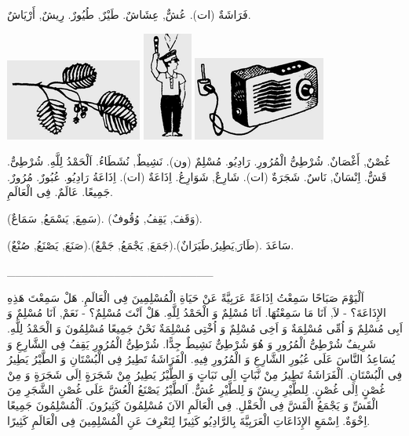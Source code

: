 \documentclass[a5paper]{article}
\begin{document}
فَرَاشَةٌ (ات). عُشٌّ, عِشَاشٌ. طَيْرٌ, طُيُورٌ. رِيشٌ, أَرْيَاشٌ. 

 \includegraphics[width=1.7602in,height=1.052in]{MuhammadBagauddinlatinized-img070.png}   \includegraphics[width=0.6354in,height=1.4063in]{MuhammadBagauddinlatinized-img071.png}   \includegraphics[width=1.7083in,height=1.0835in]{MuhammadBagauddinlatinized-img072.png} 

غُصْنٌ, أَغْصَانٌ. شُرْطِىُّ الْمُرُورِ. رَادِيُو. مُسْلِمٌ (ون). نَشِيطٌ, نُشَطَاءُ. اَلْحَمْدُ لِلَّهِ. شُرْطِىٌّ. قَشٌّ. اِنْسَانٌ, نَاسٌ. شَجَرَةٌ (ات). شَارِعٌ, شَوَارِعُ. اِذَاعَةٌ (ات). اِذَاعَةُ رَادِيُو. عُبُورٌ. مُرُورٌ. جَمِيعًا. عَالَمٌ. فِى الْعَالَمِ.

(سَمِعَ, يَسْمَعُ, سَمَاعٌ). (وَقَفَ, يَقِفُ, وُقُوفٌ).

(صَنَعَ, يَصْنَعُ, صُنْعٌ).(جَمَعَ, يَجْمَعُ, جَمْعٌ).(طَارَ,يَطِيرُ,طَيَرَانٌ). سَاعَدَ.

\_\_\_\_\_\_\_\_\_\_\_\_\_\_\_\_\_\_\_\_\_\_\_\_\_

اَلْيَوْمَ صَبَاحًا سَمِعْتُ اِذَاعَةً عَرَبِيَّةً عَنْ حَيَاةِ الْمُسْلِمِينَ فِى الْعَالَمِ. هَلْ سَمِعْتَ هَذِهِ الإِذَاعَةَ؟ - لاَ, اَنَا مَا سَمِعْتُهَا. اَنَا مُسْلِمٌ وَ الْحَمْدُ لِلَّهِ. هَلْ اَنْتَ مُسْلِمٌ؟ - نَعَمْ, اَنَا مُسْلِمٌ وَ اَبِى مُسْلِمٌ وَ اُمِّى مُسْلِمَةٌ وَ اَخِى مُسْلِمٌ وَ اُخْتِى مُسْلِمَةٌ نَحْنُ جَمِيعًا مُسْلِمُونَ وَ الْحَمْدُ لِلَّهِ. شَرِيفٌ شُرْطِىُّ الْمُرُورِ وَ هُوَ شُرْطِىٌّ نَشِيطٌ جِدًّا. شُرْطِىُّ الْمُرُورِ يَقِفُ فِى الشَّارِعِ وَ يُسَاعِدُ النَّاسَ عَلَى عُبُورِ الشَّارِعِ وَ الْمُرُورِ فِيهِ. الْفَرَاشَةُ تَطِيرُ فِى الْبُسْتَانِ وَ الطَّيْرُ يَطِيرُ فِى الْبُسْتَانِ. اَلْفَرَاشَةُ تَطِيرُ مِنْ نَّبَاتٍ اِلَى نَبَاتٍ وَ الطَّيْرُ يَطِيرُ مِنْ شَجَرَةٍ اِلَى شَجَرَةٍ وَ مِنْ غُصْنٍ اِلَى غُصْنٍ. لِلطَّيْرِ رِيشٌ وَ لِلطَّيْرِ عُشٌّ. اَلطَّيْرُ يَصْنَعُ الْعُشَّ عَلَى غُصْنِ الشَّجَرِ مِنَ الْقَشِّ وَ يَجْمَعُ الْقَشَّ فِى الْحَقْلِ. فِى الْعَالَمِ الآنَ مُسْلِمُونَ كَثِيرُونَ. اَلْمُسْلِمُونَ جَمِيعًا اِخْوَةٌ. اِسْمَعِ الإِذَاعَاتِ الْعَرَبِيَّةَ بِالرَّادِيُو كَثِيرًا لِتَعْرِفَ عَنِ الْمُسْلِمِينَ فِى الْعَالَمِ كَثِيرًا.
\end{document}
